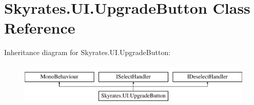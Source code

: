 \hypertarget{class_skyrates_1_1_u_i_1_1_upgrade_button}{\section{Skyrates.\-U\-I.\-Upgrade\-Button Class Reference}
\label{class_skyrates_1_1_u_i_1_1_upgrade_button}
}
Inheritance diagram for Skyrates.\-U\-I.\-Upgrade\-Button\-:\begin{figure}[H]
\begin{center}
\leavevmode
\includegraphics[height=2.000000cm]{class_skyrates_1_1_u_i_1_1_upgrade_button}
\end{center}
\end{figure}
